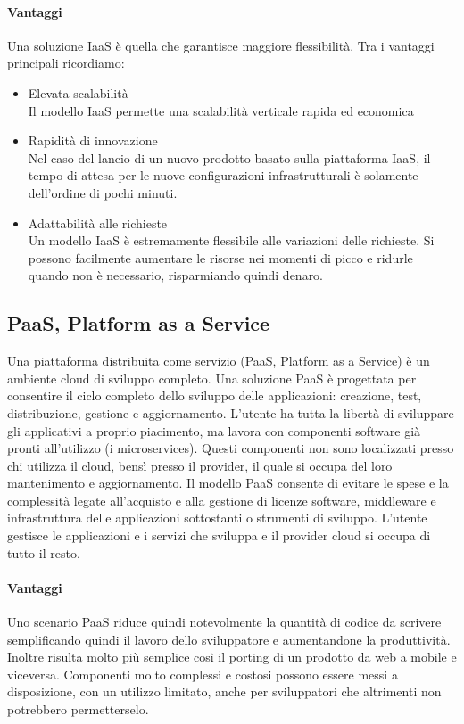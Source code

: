 \paragraph{Vantaggi}
Una soluzione IaaS è quella che garantisce maggiore flessibilità. Tra i vantaggi principali ricordiamo:
\begin{itemize}
	\item  Elevata scalabilità \\
	Il modello IaaS permette una scalabilità verticale rapida ed economica
	\item Rapidità di innovazione \\
	Nel caso del lancio di un nuovo prodotto basato sulla piattaforma IaaS, il tempo di attesa per le nuove configurazioni infrastrutturali è solamente dell'ordine di pochi minuti.
	\item Adattabilità alle richieste \\
	Un modello IaaS è estremamente flessibile alle variazioni delle richieste. Si possono facilmente aumentare le risorse nei momenti di picco e ridurle quando non è necessario, risparmiando quindi denaro.
	
\end{itemize}
\subsection{PaaS, Platform as a Service}
Una piattaforma distribuita come servizio (PaaS, Platform as a Service) è un ambiente cloud di sviluppo completo. Una soluzione PaaS è progettata per consentire il ciclo completo dello sviluppo delle applicazioni: creazione, test, distribuzione, gestione e aggiornamento. L'utente ha tutta la libertà di sviluppare gli applicativi a proprio piacimento, ma lavora con componenti software già pronti all'utilizzo (i microservices). Questi componenti non sono localizzati presso chi utilizza il cloud, bensì presso il provider, il quale si occupa del loro mantenimento e aggiornamento. Il modello PaaS consente di evitare le spese e la complessità legate all'acquisto e alla gestione di licenze software, middleware e infrastruttura delle applicazioni sottostanti o strumenti di sviluppo. L'utente gestisce le applicazioni e i servizi che sviluppa e il provider cloud si occupa di tutto il resto.
\paragraph{Vantaggi}
Uno scenario PaaS riduce quindi notevolmente la quantità di codice da scrivere semplificando quindi il lavoro dello sviluppatore e aumentandone la produttività. Inoltre risulta molto più semplice così il porting di un prodotto da web a mobile e viceversa. Componenti molto complessi e costosi possono essere messi a disposizione, con un utilizzo limitato, anche per sviluppatori che altrimenti non potrebbero permetterselo. 
